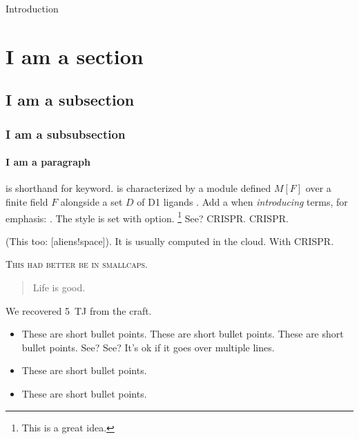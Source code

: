 
\begin{MainChapter}{Introduction}


\section{I am a section}

\subsection{I am a subsection}

\subsubsection{I am a subsubsection}

\paragraph*{I am a paragraph}  %
 is shorthand for keyword.
 is characterized by a module defined $M[F]$ over a finite field $F$ alongside a set $D$ of \ac{D1} ligands \cite{yolov6}.
Add a \code{*} when \emph{introducing} terms, for emphasis: .
The style is set with  option. \footnote{This is a great idea.} See? \ac{CRISPR}. \ac{CRISPR}.

(This too: [aliens!space]).
It is usually computed in the cloud. With \ac{CRISPR}.

\textsc{This had better be in smallcaps.}

\blockcquote{johnson2022}{Life is good.}

We recovered \qty{5}{\tera\joule} from the craft.

\begin{itemize}
    \item These are short bullet points. These are short bullet points. These are short bullet points. See? See? It's ok if it goes over multiple lines.
    \item These are short bullet points.
    \item These are short bullet points.
\end{itemize}


\end{MainChapter}
